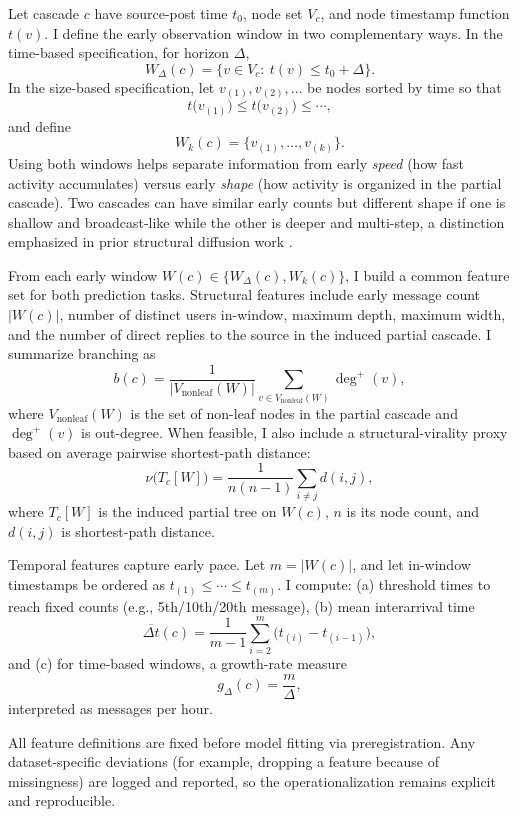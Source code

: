 Let cascade \(c\) have source-post time \(t_0\), node set \(V_c\), and node timestamp function \(t(v)\). I define the early observation window in two complementary ways. In the time-based specification, for horizon \(\Delta\),
\[
W_{\Delta}(c)=\{v\in V_c:\ t(v)\le t_0+\Delta\}.
\]
In the size-based specification, let \(v_{(1)},v_{(2)},\ldots\) be nodes sorted by time so that
\[
t\!\bigl(v_{(1)}\bigr)\le t\!\bigl(v_{(2)}\bigr)\le \cdots,
\]
and define
\[
W_{k}(c)=\{v_{(1)},\ldots,v_{(k)}\}.
\]
Using both windows helps separate information from early \emph{speed} (how fast activity accumulates) versus early \emph{shape} (how activity is organized in the partial cascade).
Two cascades can have similar early counts but different shape if one is shallow and broadcast-like while the other is deeper and multi-step, a distinction emphasized in prior structural diffusion work \citep{goel_structural_2016}.

From each early window \(W(c)\in\{W_{\Delta}(c),W_k(c)\}\), I build a common feature set for both prediction tasks. Structural features include early message count \(|W(c)|\), number of distinct users in-window, maximum depth, maximum width, and the number of direct replies to the source in the induced partial cascade. I summarize branching as
\[
b(c)=\frac{1}{|V_{\text{nonleaf}}(W)|}\sum_{v\in V_{\text{nonleaf}}(W)}\deg^{+}(v),
\]
where \(V_{\text{nonleaf}}(W)\) is the set of non-leaf nodes in the partial cascade and \(\deg^{+}(v)\) is out-degree. When feasible, I also include a structural-virality proxy based on average pairwise shortest-path distance:
\[
\nu\!\bigl(T_c[W]\bigr)=\frac{1}{n(n-1)}\sum_{i\neq j} d(i,j),
\]
where \(T_c[W]\) is the induced partial tree on \(W(c)\), \(n\) is its node count, and \(d(i,j)\) is shortest-path distance.

Temporal features capture early pace. Let \(m=|W(c)|\), and let in-window timestamps be ordered as \(t_{(1)}\le\cdots\le t_{(m)}\). I compute: (a) threshold times to reach fixed counts (e.g., 5th/10th/20th message), (b) mean interarrival time
\[
\overline{\Delta t}(c)=\frac{1}{m-1}\sum_{i=2}^{m}\bigl(t_{(i)}-t_{(i-1)}\bigr),
\]
and (c) for time-based windows, a growth-rate measure
\[
g_{\Delta}(c)=\frac{m}{\Delta},
\]
interpreted as messages per hour.

All feature definitions are fixed before model fitting via preregistration. Any dataset-specific deviations (for example, dropping a feature because of missingness) are logged and reported, so the operationalization remains explicit and reproducible.


